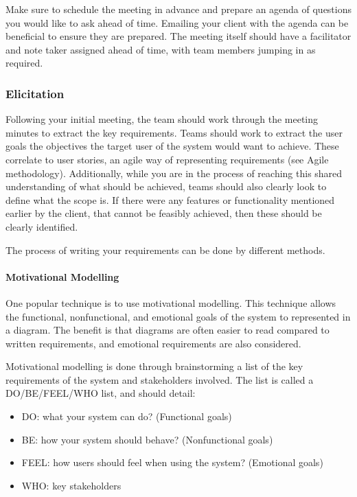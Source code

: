 \documentclass[letterpaper,10pt,english]{jupyterBook}
\begin{document}
\sphinxAtStartPar
Make sure to schedule the meeting in advance and prepare an agenda of
questions you would like to ask ahead of time. Emailing your client with
the agenda can be beneficial to ensure they are prepared. The meeting
itself should have a facilitator and note taker assigned ahead of time,
with team members jumping in as required.


\subsubsection{Elicitation}
\label{\detokenize{chapter_8/requirements_elicitation:elicitation}}
\sphinxAtStartPar
Following your initial meeting, the team should work through the meeting
minutes to extract the key requirements. Teams should work to extract
the user goals \sphinxhyphen{} the objectives the target user of the system would want
to achieve. These correlate to user stories, an agile way of
representing requirements (see Agile methodology). Additionally, while
you are in the process of reaching this shared understanding of what
should be achieved, teams should also clearly look to define what the
scope is. If there were any features or functionality mentioned earlier
by the client, that cannot be feasibly achieved, then these should be
clearly identified.

\sphinxAtStartPar
The process of writing your requirements can be done by different
methods.


\paragraph{Motivational Modelling}
\label{\detokenize{chapter_8/requirements_elicitation:motivational-modelling}}
\sphinxAtStartPar
One popular technique is to use motivational modelling. This technique
allows the functional, non\sphinxhyphen{}functional, and emotional goals of the system
to represented in a diagram. The benefit is that diagrams are often
easier to read compared to written requirements, and emotional
requirements are also considered.

\sphinxAtStartPar
Motivational modelling is done through brainstorming a list of the key
requirements of the system and stakeholders involved. The list is called
a DO/BE/FEEL/WHO list, and should detail:
\begin{itemize}
\item {} 
\sphinxAtStartPar
DO: what your system can do? (Functional goals)

\item {} 
\sphinxAtStartPar
BE: how your system should behave? (Non\sphinxhyphen{}functional goals)

\item {} 
\sphinxAtStartPar
FEEL: how users should feel when using the system? (Emotional goals)

\item {} 
\sphinxAtStartPar
WHO: key stakeholders

\end{itemize}
\end{document}
